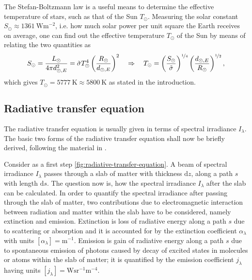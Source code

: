 \documentclass[a4paper,12pt]{report}
\begin{document}
The Stefan-Boltzmann law is a useful means to determine the effective temperature of stars, such as that of the Sun $T_\odot$. Measuring the solar constant $S_\odot \approx \SI{1361}{\watt\meter^{-2}}$, i.e. how much solar power per unit square the Earth receives on average, one can find out the effective temperature $T_\odot$ of the Sun by means of relating the two quantities as \begin{equation}
S_\odot = \frac{L_\odot}{4\pi d_{\odot,E}^2} = \tilde{\sigma}T_\odot^4\left(\frac{R_\odot}{d_{\odot,E}}\right)^2 \quad \Rightarrow \quad T_{\odot} = \left(\frac{S_\odot}{\tilde{\sigma}}\right)^{\nicefrac{1}{4}}\left(\frac{d_{\odot,E}}{R_\odot}\right)^{\nicefrac{1}{2}},
\end{equation} which gives $T_\odot = \SI{5777}{\kelvin} \approx \SI{5800}{\kelvin}$ as stated in the introduction. 

\subsection{Radiative transfer equation}
The radiative transfer equation is usually given in terms of spectral irradiance $I_\lambda$. The basic two forms of the radiative transfer equation shall now be briefly derived, following the material in \cite[pp.27-40]{Rutten.2015}.

Consider as a first step \cref{fig:radiative-transfer-equation}. A beam of spectral irradiance $I_\lambda$ passes through a slab of matter with thickness $\mathrm{d}z$, along a path $s$ with length $\mathrm{d}s$. The question now is, how the spectral irradiance $I_\lambda$ after the slab can be calculated. In order to quantify the spectral irradiance after passing through the slab of matter, two contributions due to electromagnetic interaction between radiation and matter within the slab have to be considered, namely extinction and emission. Extinction is loss of radiative energy along a path $s$ due to scattering or absorption and it is accounted for by the extinction coefficient $\alpha_\lambda$ with units $[\alpha_\lambda] = \si{\meter^{-1}}$. Emission is gain of radiative energy along a path $s$ due to spontaneous emission of photons caused by decay of excited states in molecules or atoms within the slab of matter; it is quantified by the emission coefficient $j_\lambda$ having units $[j_\lambda] = \si{\watt\steradian^{-1}\meter^{-4}}$.
\end{document}
